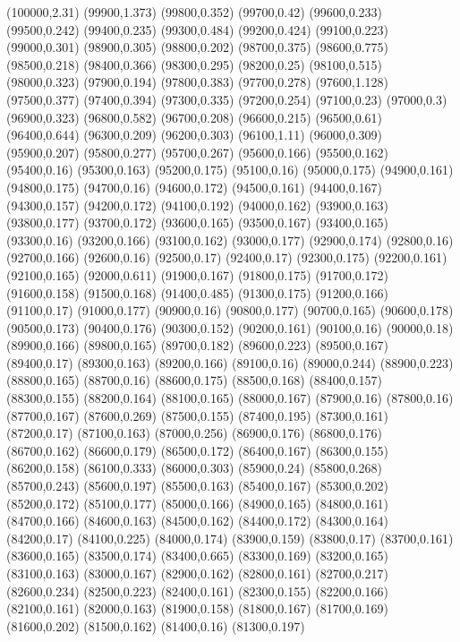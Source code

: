 (100000,2.31)
(99900,1.373)
(99800,0.352)
(99700,0.42)
(99600,0.233)
(99500,0.242)
(99400,0.235)
(99300,0.484)
(99200,0.424)
(99100,0.223)
(99000,0.301)
(98900,0.305)
(98800,0.202)
(98700,0.375)
(98600,0.775)
(98500,0.218)
(98400,0.366)
(98300,0.295)
(98200,0.25)
(98100,0.515)
(98000,0.323)
(97900,0.194)
(97800,0.383)
(97700,0.278)
(97600,1.128)
(97500,0.377)
(97400,0.394)
(97300,0.335)
(97200,0.254)
(97100,0.23)
(97000,0.3)
(96900,0.323)
(96800,0.582)
(96700,0.208)
(96600,0.215)
(96500,0.61)
(96400,0.644)
(96300,0.209)
(96200,0.303)
(96100,1.11)
(96000,0.309)
(95900,0.207)
(95800,0.277)
(95700,0.267)
(95600,0.166)
(95500,0.162)
(95400,0.16)
(95300,0.163)
(95200,0.175)
(95100,0.16)
(95000,0.175)
(94900,0.161)
(94800,0.175)
(94700,0.16)
(94600,0.172)
(94500,0.161)
(94400,0.167)
(94300,0.157)
(94200,0.172)
(94100,0.192)
(94000,0.162)
(93900,0.163)
(93800,0.177)
(93700,0.172)
(93600,0.165)
(93500,0.167)
(93400,0.165)
(93300,0.16)
(93200,0.166)
(93100,0.162)
(93000,0.177)
(92900,0.174)
(92800,0.16)
(92700,0.166)
(92600,0.16)
(92500,0.17)
(92400,0.17)
(92300,0.175)
(92200,0.161)
(92100,0.165)
(92000,0.611)
(91900,0.167)
(91800,0.175)
(91700,0.172)
(91600,0.158)
(91500,0.168)
(91400,0.485)
(91300,0.175)
(91200,0.166)
(91100,0.17)
(91000,0.177)
(90900,0.16)
(90800,0.177)
(90700,0.165)
(90600,0.178)
(90500,0.173)
(90400,0.176)
(90300,0.152)
(90200,0.161)
(90100,0.16)
(90000,0.18)
(89900,0.166)
(89800,0.165)
(89700,0.182)
(89600,0.223)
(89500,0.167)
(89400,0.17)
(89300,0.163)
(89200,0.166)
(89100,0.16)
(89000,0.244)
(88900,0.223)
(88800,0.165)
(88700,0.16)
(88600,0.175)
(88500,0.168)
(88400,0.157)
(88300,0.155)
(88200,0.164)
(88100,0.165)
(88000,0.167)
(87900,0.16)
(87800,0.16)
(87700,0.167)
(87600,0.269)
(87500,0.155)
(87400,0.195)
(87300,0.161)
(87200,0.17)
(87100,0.163)
(87000,0.256)
(86900,0.176)
(86800,0.176)
(86700,0.162)
(86600,0.179)
(86500,0.172)
(86400,0.167)
(86300,0.155)
(86200,0.158)
(86100,0.333)
(86000,0.303)
(85900,0.24)
(85800,0.268)
(85700,0.243)
(85600,0.197)
(85500,0.163)
(85400,0.167)
(85300,0.202)
(85200,0.172)
(85100,0.177)
(85000,0.166)
(84900,0.165)
(84800,0.161)
(84700,0.166)
(84600,0.163)
(84500,0.162)
(84400,0.172)
(84300,0.164)
(84200,0.17)
(84100,0.225)
(84000,0.174)
(83900,0.159)
(83800,0.17)
(83700,0.161)
(83600,0.165)
(83500,0.174)
(83400,0.665)
(83300,0.169)
(83200,0.165)
(83100,0.163)
(83000,0.167)
(82900,0.162)
(82800,0.161)
(82700,0.217)
(82600,0.234)
(82500,0.223)
(82400,0.161)
(82300,0.155)
(82200,0.166)
(82100,0.161)
(82000,0.163)
(81900,0.158)
(81800,0.167)
(81700,0.169)
(81600,0.202)
(81500,0.162)
(81400,0.16)
(81300,0.197)
